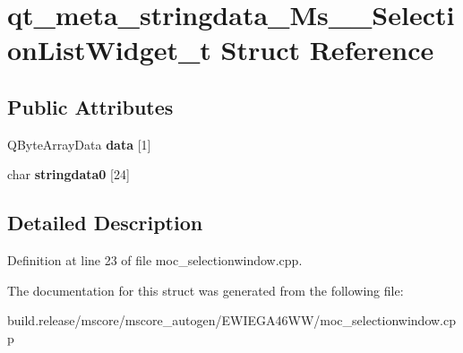 \hypertarget{structqt__meta__stringdata___ms_____selection_list_widget__t}{}\section{qt\+\_\+meta\+\_\+stringdata\+\_\+\+Ms\+\_\+\+\_\+\+Selection\+List\+Widget\+\_\+t Struct Reference}
\label{structqt__meta__stringdata___ms_____selection_list_widget__t}
\subsection*{Public Attributes}
\begin{DoxyCompactItemize}
\item 
\mbox{\label{structqt__meta__stringdata___ms_____selection_list_widget__t_ae131e4395d1676accd6e5144ec5b54ef}} 
Q\+Byte\+Array\+Data {\bfseries data} \mbox{[}1\mbox{]}
\item 
\mbox{\label{structqt__meta__stringdata___ms_____selection_list_widget__t_aca7dcb1af56626cf31cd001369b1a0b0}} 
char {\bfseries stringdata0} \mbox{[}24\mbox{]}
\end{DoxyCompactItemize}


\subsection{Detailed Description}


Definition at line 23 of file moc\+\_\+selectionwindow.\+cpp.



The documentation for this struct was generated from the following file\+:\begin{DoxyCompactItemize}
\item 
build.\+release/mscore/mscore\+\_\+autogen/\+E\+W\+I\+E\+G\+A46\+W\+W/moc\+\_\+selectionwindow.\+cpp\end{DoxyCompactItemize}
